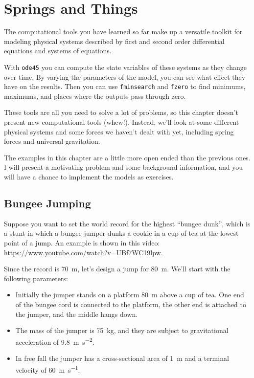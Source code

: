 \chapter{Springs and Things}

The computational tools you have learned so far make up a versatile toolkit for modeling physical systems described by first and second order differential equations and systems of equations.

With {\tt ode45} you can compute the state variables of these systems as they change over time.
By varying the parameters of the model, you can see what effect they have on the results.
Then you can use {\tt fminsearch} and {\tt fzero} to find minimums, maximums, and places where the outputs pass through zero.

These tools are all you need to solve a lot of problems, so this chapter doesn't present new computational tools (whew!).  Instead, we'll look at some different physical systems and some forces we haven't dealt with yet, including spring forces and universal gravitation.

The examples in this chapter are a little more open ended than the previous ones.
I will present a motivating problem and some background information, and you will have a chance to implement the models as exercises.


\section{Bungee Jumping}
\label{bungee}


Suppose you want to set the world record for the highest ``bungee dunk'', which is a stunt in which a bungee jumper dunks a cookie in a cup of tea at the lowest point of a jump.  An example is shown in this video: \url{https://www.youtube.com/watch?v=UBf7WC19lpw}.

Since the record is \SI{70}{\meter}, let's design a jump for \SI{80}{\meter}.  We'll start with the following parameters:

\begin{itemize}

\item  Initially the jumper stands on a platform \SI{80}{\meter} above a cup of tea.  One end of the bungee cord is connected to the platform, the other end is attached to the jumper, and the middle hangs down.

\item The mass of the jumper is \SI{75}{\kilogram}, and they are subject to gravitational acceleration of \SI{9.8}{\meter \per \second \squared}.

\item In free fall the jumper has a cross-sectional area of \SI{1}{\meter} and a terminal velocity of \SI{60}{\meter\per\second}.

\end{itemize}

